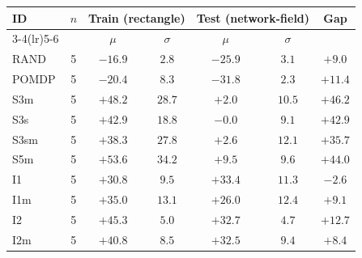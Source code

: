 \begin{tabular}{lcccccc}
  \toprule
  \textbf{ID} & \textbf{$n$}
  & \multicolumn{2}{c}{\textbf{Train (rectangle)}}
  & \multicolumn{2}{c}{\textbf{Test (network-field)}}
  & \textbf{Gap} \\
  \cmidrule(lr){3-4}\cmidrule(lr){5-6}
  & & $\mu$ & $\sigma$ & $\mu$ & $\sigma$ & \\
  \midrule
  RAND & 5 & $-16.9$ & $2.8$ & $-25.9$ & $3.1$ & $+9.0$ \\
  POMDP & 5 & $-20.4$ & $8.3$ & $-31.8$ & $2.3$ & $+11.4$ \\
  \midrule
  S3m & 5 & $+48.2$ & $28.7$ & $+2.0$ & $10.5$ & $+46.2$ \\
  S3s & 5 & $+42.9$ & $18.8$ & $-0.0$ & $9.1$ & $+42.9$ \\
  S3sm & 5 & $+38.3$ & $27.8$ & $+2.6$ & $12.1$ & $+35.7$ \\
  S5m & 5 & $+53.6$ & $34.2$ & $+9.5$ & $9.6$ & $+44.0$ \\
  I1 & 5 & $+30.8$ & $9.5$ & $+33.4$ & $11.3$ & $-2.6$ \\
  I1m & 5 & $+35.0$ & $13.1$ & $+26.0$ & $12.4$ & $+9.1$ \\
  I2 & 5 & $+45.3$ & $5.0$ & $+32.7$ & $4.7$ & $+12.7$ \\
  I2m & 5 & $+40.8$ & $8.5$ & $+32.5$ & $9.4$ & $+8.4$ \\
  \bottomrule
\end{tabular}
